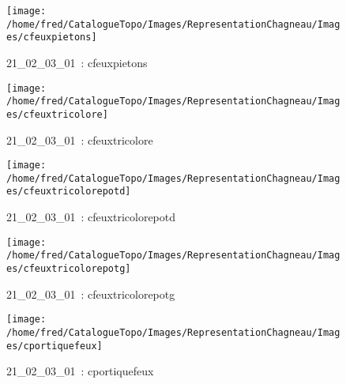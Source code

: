 \documentclass[12pt,titlepage]{book}
\begin{document}
\begin{figure}[h!]
  \hfill         %
  \begin{minipage}[t]{3cm}
    \begin{center}
      \texttt{[image: /home/fred/CatalogueTopo/Images/RepresentationChagneau/Images/cfeuxpietons]}
      \caption[~21\_02\_03\_01]{\small{21\_02\_03\_01~:} \tiny{cfeuxpietons}}\label{cfeuxpietons}
    \end{center}
  \end{minipage}
  \begin{minipage}[t]{3cm}
    \begin{center}
      \texttt{[image: /home/fred/CatalogueTopo/Images/RepresentationChagneau/Images/cfeuxtricolore]}
      \caption[~21\_02\_03\_01]{\small{21\_02\_03\_01~:} \tiny{cfeuxtricolore}}\label{cfeuxtricolore}
    \end{center}
  \end{minipage}
  \begin{minipage}[t]{3cm}
    \begin{center}
      \texttt{[image: /home/fred/CatalogueTopo/Images/RepresentationChagneau/Images/cfeuxtricolorepotd]}
      \caption[~21\_02\_03\_01]{\small{21\_02\_03\_01~:} \tiny{cfeuxtricolorepotd}}\label{cfeuxtricolorepotd}
    \end{center}
  \end{minipage}
  \begin{minipage}[t]{3cm}
    \begin{center}
      \texttt{[image: /home/fred/CatalogueTopo/Images/RepresentationChagneau/Images/cfeuxtricolorepotg]}
      \caption[~21\_02\_03\_01]{\small{21\_02\_03\_01~:} \tiny{cfeuxtricolorepotg}}\label{cfeuxtricolorepotg}
    \end{center}
  \end{minipage}
  \begin{minipage}[t]{3cm}
    \begin{center}
      \texttt{[image: /home/fred/CatalogueTopo/Images/RepresentationChagneau/Images/cportiquefeux]}
      \caption[~21\_02\_03\_01]{\small{21\_02\_03\_01~:} \tiny{cportiquefeux}}\label{cportiquefeux}
    \end{center}
  \end{minipage}

\end{figure}
\end{document}
